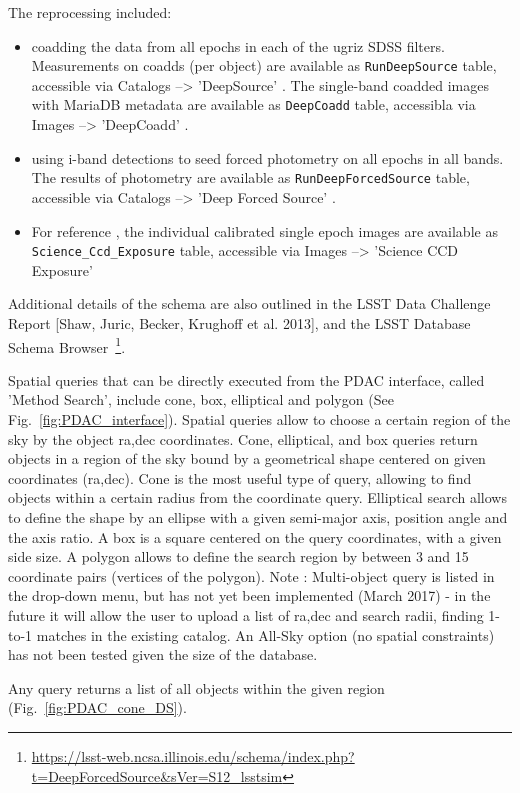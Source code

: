 \documentclass[DM,lsstdraft,toc,usenatbib]{lsstdoc}
\begin{document}
The reprocessing included: 
\begin{itemize}
\item coadding the data from all epochs in each of the ugriz SDSS filters. Measurements on coadds (per object) are available as  \verb|RunDeepSource| table, accessible via Catalogs -->   'DeepSource' .  The single-band coadded images with MariaDB metadata are available as \verb|DeepCoadd| table, accessibla via Images -->  'DeepCoadd' . 
\item using i-band detections to seed forced photometry on all epochs in all bands. The results of photometry are available as \verb|RunDeepForcedSource| table, accessible via  Catalogs --> 'Deep Forced Source' .  
\item For reference , the individual calibrated single epoch images are available as \verb|Science_Ccd_Exposure| table, accessible via Images --> 'Science CCD Exposure'   
\end{itemize}

Additional details of the schema are also outlined in the LSST Data Challenge Report [Shaw, Juric, Becker, Krughoff et al. 2013], and the LSST Database Schema Browser~\footnote{\url{https://lsst-web.ncsa.illinois.edu/schema/index.php?t=DeepForcedSource&sVer=S12_lsstsim}}. 


Spatial queries that can be directly executed from the PDAC interface, called 'Method Search',  include cone, box, elliptical and polygon (See Fig.~\ref{fig:PDAC_interface}).  Spatial queries allow to choose a certain region of the sky by the object ra,dec coordinates.  
Cone, elliptical, and box queries  return objects in a region of the sky bound by a geometrical shape centered on given coordinates (ra,dec). Cone is the most useful type of query, allowing to find objects within a certain radius from the coordinate query.  Elliptical search allows to define the shape by an ellipse with a given semi-major axis,  position angle and the axis ratio. A box is a square centered on the query coordinates, with a given side size.  A polygon allows to define the search region by between 3 and 15 coordinate pairs (vertices of the polygon). Note : Multi-object query is listed in the drop-down menu, but has not yet been implemented (March 2017) - in the future it will allow the user to upload a list of ra,dec and search radii,  finding 1-to-1 matches in the existing catalog. An All-Sky option (no spatial constraints) has not been tested given the size of the database.  

Any query returns a list of all objects within the given region (Fig.~\ref{fig:PDAC_cone_DS}).  
\end{document}
